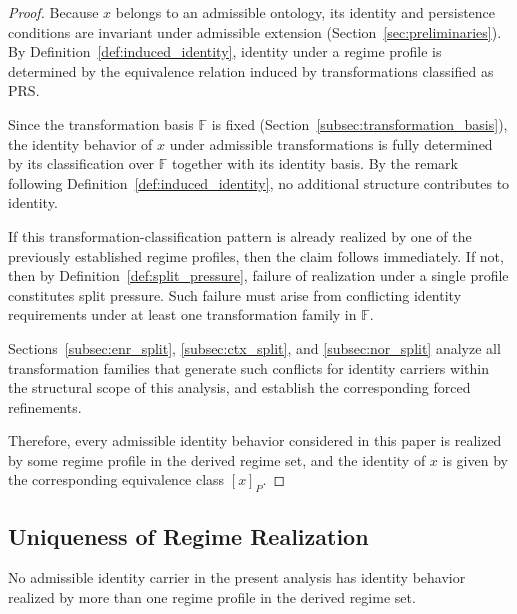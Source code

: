 \begin{proof}
Because $x$ belongs to an admissible ontology, its identity and persistence
conditions are invariant under admissible extension
(Section~\ref{sec:preliminaries}).
By Definition~\ref{def:induced_identity},
identity under a regime profile is determined by the equivalence relation
induced by transformations classified as $\mathrm{PRS}$.

Since the transformation basis $\mathbb{F}$ is fixed
(Section~\ref{subsec:transformation_basis}),
the identity behavior of $x$ under admissible transformations is fully determined
by its classification over $\mathbb{F}$ together with its identity basis.
By the remark following Definition~\ref{def:induced_identity},
no additional structure contributes to identity.

If this transformation-classification pattern is already realized by one of the
previously established regime profiles, then the claim follows immediately.
If not, then by Definition~\ref{def:split_pressure},
failure of realization under a single profile constitutes split pressure.
Such failure must arise from conflicting identity requirements under at least
one transformation family in $\mathbb{F}$.

Sections~\ref{subsec:enr_split}, \ref{subsec:ctx_split}, and \ref{subsec:nor_split}
analyze all transformation families that generate such conflicts for
identity carriers within the structural scope of this analysis,
and establish the corresponding forced refinements.

Therefore, every admissible identity behavior considered in this paper
is realized by some regime profile in the derived regime set,
and the identity of $x$ is given by the corresponding equivalence class $[x]_P$.
\end{proof}

\subsection{Uniqueness of Regime Realization}
\label{subsec:uniqueness}

\begin{lemma}
\label{lem:profile_uniqueness}
No admissible identity carrier in the present analysis has identity behavior
realized by more than one regime profile in the derived regime set.
\end{lemma}

